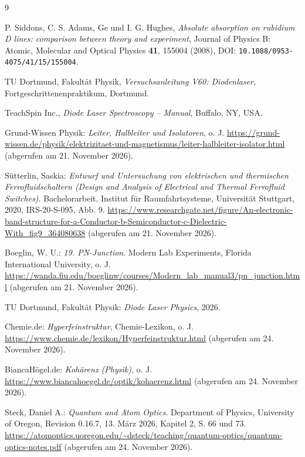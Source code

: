 \begin{thebibliography}{9}

P. Siddons, C. S. Adams, Ge und I. G. Hughes,
\textit{Absolute absorption on rubidium D lines: comparison between theory and experiment},
Journal of Physics B: Atomic, Molecular and Optical Physics \textbf{41}, 155004 (2008),
DOI: \texttt{10.1088/0953-4075/41/15/155004}.

TU Dortmund, Fakultät Physik,
\textit{Versuchsanleitung V60: Diodenlaser},
Fortgeschrittenenpraktikum, Dortmund.

TeachSpin Inc.,
\textit{Diode Laser Spectroscopy -- Manual},
Buffalo, NY, USA.

Grund-Wissen Physik: \textit{Leiter, Halbleiter und Isolatoren}, o. J.
\url{https://grund-wissen.de/physik/elektrizitaet-und-magnetismus/leiter-halbleiter-isolator.html}
(abgerufen am 21. November 2026).

Sütterlin, Saskia: \textit{Entwurf und Untersuchung von elektrischen und thermischen Ferrofluidschaltern (Design and Analysis of Electrical and Thermal Ferrofluid Switches)}.
Bachelorarbeit, Institut für Raumfahrtsysteme, Universität Stuttgart, 2020,
IRS-20-S-095, Abb. 9.
\url{https://www.researchgate.net/figure/An-electronic-band-structure-for-a-Conductor-b-Semiconductor-c-Dielectric-With_fig9_364080638}
(abgerufen am 21. November 2026).

Boeglin, W. U.: \textit{19. PN-Junction}.
Modern Lab Experiments, Florida International University, o. J.
\url{https://wanda.fiu.edu/boeglinw/courses/Modern_lab_manual3/pn_junction.html}
(abgerufen am 21. November 2026).

TU Dortmund, Fakultät Physik: \textit{Diode Laser Physics}, 2026.

Chemie.de: \textit{Hyperfeinstruktur}, Chemie-Lexikon, o. J.
\url{https://www.chemie.de/lexikon/Hyperfeinstruktur.html}
(abgerufen am 24. November 2026).

BiancaHögel.de: \textit{Kohärenz (Physik)}, o. J.
\url{https://www.biancahoegel.de/optik/kohaerenz.html}
(abgerufen am 24. November 2026).

Steck, Daniel A.: \textit{Quantum and Atom Optics}.
Department of Physics, University of Oregon, Revision 0.16.7, 13. März 2026,
Kapitel 2, S. 66 und 73.
\url{https://atomoptics.uoregon.edu/~dsteck/teaching/quantum-optics/quantum-optics-notes.pdf}
(abgerufen am 24. November 2026).


\end{thebibliography}
